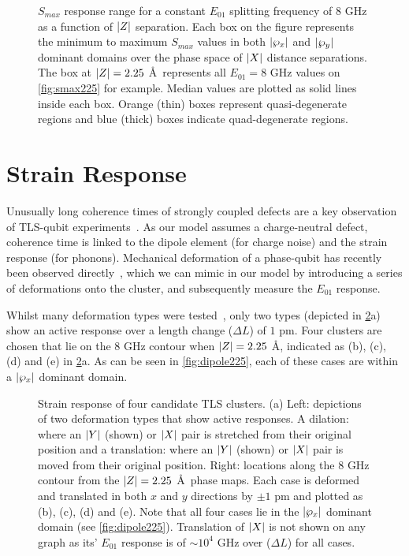 \begin{figure}[htp]
\resizebox{\textwidth}{!}{}
\caption[$S_{max}$ response range]{\label{fig:smaxz}$S_{max}$ response range for a constant $E_{01}$ splitting frequency of $8$ GHz as a function of $\lvert Z\rvert$ separation. Each box on the figure represents the minimum to maximum $S_{max}$ values in both $\lvert\wp_{x}\rvert$ and $\lvert\wp_{y}\rvert$ dominant domains over the phase space of $\lvert X\rvert$ distance separations. The box at $\lvert Z\rvert = 2.25$ \AA\ represents all $E_{01} = 8$ GHz values on \cref{fig:smax225} for example. Median values are plotted as solid lines inside each box. Orange (thin) boxes represent quasi-degenerate regions and blue (thick) boxes indicate quad-degenerate regions.}
\end{figure}

\section{Strain Response}\label{sec:strain}

Unusually long coherence times of strongly coupled defects are a key observation of TLS-qubit experiments~\cite{Neeley2008, Lisenfeld2010a}.
As our model assumes a charge-neutral defect, coherence time is linked to the dipole element (for charge noise) and the strain response (for phonons).
Mechanical deformation of a phase-qubit has recently been observed directly~\cite{Grabovskij2012}, which we can mimic in our  model by introducing a series of deformations onto the cluster, and subsequently measure the $E_{01}$ response.

Whilst many deformation types were tested~\cite{DuBois2013}, only two types (depicted in \cref{fig:strain}a) show an active response over a length change ($\Delta L$) of $1$ pm.
Four clusters are chosen that lie on the $8$ GHz contour when $\lvert Z\rvert = 2.25$ \AA, indicated as (b), (c), (d) and (e) in \cref{fig:strain}a.
As can be seen in \cref{fig:dipole225}, each of these cases are within a $\lvert\wp_x\rvert$ dominant domain.

\begin{figure}[htp]
\resizebox{0.7\textwidth}{!}{}
\caption[Strain response of TLS clusters]{\label{fig:strain}Strain response of four candidate TLS clusters. (a) Left: depictions of two deformation types that show active responses. A dilation: where an $\lvert Y\rvert$ (shown) or $\lvert X\rvert$ pair is stretched from their original position and a translation: where an $\lvert Y\rvert$ (shown) or $\lvert X\rvert$ pair is moved from their original position. Right: locations along the $8$ GHz contour from the $\lvert Z\rvert = 2.25$ \AA\ phase maps. Each case is deformed and translated in both $x$ and $y$ directions by $\pm 1$ pm and plotted as (b), (c), (d) and (e). Note that all four cases lie in the $\lvert\wp_x\rvert$ dominant domain (see \cref{fig:dipole225}). Translation of $\lvert X\rvert$ is not shown on any graph as its' $E_{01}$ response is of $\sim\!10^4$ GHz over ($\Delta L$) for all cases.}
\end{figure}

